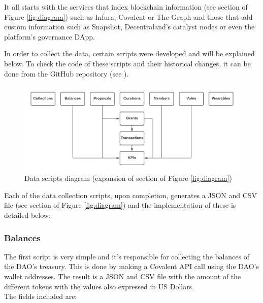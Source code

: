 \documentclass[MSE,Master,english]{twbook}%
\newcommand{\rom}[1]{\uppercase\expandafter{\romannumeral #1\relax}}
\begin{document}
It all starts with the services that index blockchain information (see section \rom{1} of Figure \ref{fig:diagram}) such as Infura, Covalent or The Graph and those that add custom information such as Snapshot, Decentraland's catalyst nodes or even the platform's governance \gls{DApp}.

In order to collect the data, certain scripts were developed and will be explained below. To check the code of these scripts and their historical changes, it can be done from the GitHub repository (see \cite{transparencyRepo}). \\

\begin{figure}[H]
  \centering
  \includegraphics[width=\textwidth]{scripts_diagram.png}
  \caption{Data scripts diagram (expansion of section \rom{2} of Figure \ref{fig:diagram})}
  \label{fig:scripts_diagram}
\end{figure}

Each of the data collection scripts, upon completion, generates a JSON and CSV file (see section \rom{3} of Figure \ref{fig:diagram}) and the implementation of these is detailed below:
\subsubsection{Balances}
The first script is very simple and it's responsible for collecting the balances of the DAO's treasury. This is done by making a Covalent API call using the DAO's wallet addresses. The result is a JSON and CSV file with the amount of the different tokens with the values also expressed in US Dollars. \\

The fields included are:
\end{document}
